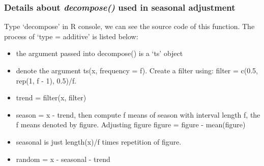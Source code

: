 \documentclass[a4paper,10pt]{article}
\begin{document}
\subsubsection{Details about \textit{decompose()} used in seasonal adjustment}
Type `decompose' in R console, we can see the source code of this function. The process of `type = additive' is listed below:
\begin{itemize}
\item the argument passed into decompose() is a `ts' object 
\item denote the argument ts(x, frequency = f). Create a filter using: filter = c(0.5, rep(1, f - 1), 0.5)/f.
\item trend = filter(x, filter)
\item season = x - trend, then compute f means of season with interval length f, the f means denoted by figure. Adjusting figure figure = figure - mean(figure)
\item seasonal is just length(x)/f times repetition of figure.
\item random = x - seasonal - trend
\end{itemize}
\end{document}
